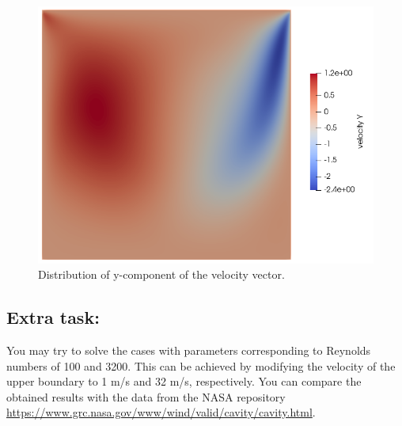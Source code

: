 \begin{figure}[H]
\centering
\includegraphics[scale=0.5]{DC_velocity_y}
\caption{Distribution of y-component of the velocity vector.}\label{fg:DC_velocity_y}
\end{figure} 

\subsection*{Extra task:}

You may try to solve the cases with parameters corresponding to Reynolds numbers of 100 and 3200.
This can be achieved by modifying the velocity of the upper boundary to 1 m/s and 32 m/s, respectively.
You can compare the obtained results with the data from the NASA repository \url{https://www.grc.nasa.gov/www/wind/valid/cavity/cavity.html}.

\hfill
